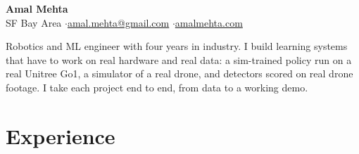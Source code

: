 \documentclass[10pt]{article}
\begin{document}
\fontsize{9.8}{10.8}\selectfont

\begin{center}
{\LARGE\bfseries Amal Mehta}\\[3pt]
SF Bay Area \quad$\cdot$\quad \href{mailto:amal.mehta@gmail.com}{amal.mehta@gmail.com} \quad$\cdot$\quad \href{https://amalmehta.com/}{amalmehta.com}
\end{center}

Robotics and ML engineer with four years in industry. I build learning systems that have to work on real hardware and real data: a sim-trained policy run on a real Unitree Go1, a simulator of a real drone, and detectors scored on real drone footage. I take each project end to end, from data to a working demo.

\section*{Experience}
\end{document}
